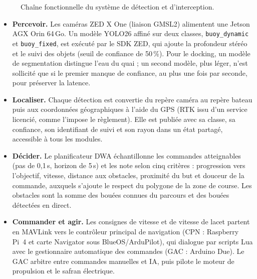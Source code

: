 \documentclass[11pt,letterpaper]{article}
\begin{document}
\begin{figure}[H]
\caption{Chaîne fonctionnelle du système de détection et d'interception.}
\label{fig:chaine}
\end{figure}

\begin{itemize}
    \item \textbf{Percevoir.} Les caméras ZED X One (liaison GMSL2) alimentent
    une Jetson AGX Orin 64\,Go. Un modèle YOLO26 affiné sur deux classes,
    \texttt{buoy\_dynamic} et \texttt{buoy\_fixed}, est exécuté par le SDK
    ZED, qui ajoute la profondeur stéréo et le suivi des objets (seuil de
    confiance de 50\,\%). Pour le docking, un modèle de segmentation distingue
    l'eau du quai ; un second modèle, plus léger, n'est sollicité que si le
    premier manque de confiance, au plus une fois par seconde, pour préserver
    la latence.
    \item \textbf{Localiser.} Chaque détection est convertie du repère caméra
    au repère bateau puis aux coordonnées géographiques à l'aide du GPS (RTK
    issu d'un service licencié, comme l'impose le règlement). Elle est publiée
    avec sa classe, sa confiance, son identifiant de suivi et son rayon dans un
    état partagé, accessible à tous les modules.
    \item \textbf{Décider.} Le planificateur DWA échantillonne les commandes
    atteignables (pas de 0,1\,s, horizon de 5\,s) et les note selon cinq
    critères : progression vers l'objectif, vitesse, distance aux obstacles,
    proximité du but et douceur de la commande, auxquels s'ajoute le respect
    du polygone de la zone de course. Les obstacles sont la somme des bouées
    connues du parcours et des bouées détectées en direct.
    \item \textbf{Commander et agir.} Les consignes de vitesse et de vitesse de
    lacet partent en MAVLink vers le contrôleur principal de navigation (CPN :
    Raspberry Pi~4 et carte Navigator sous BlueOS/ArduPilot), qui dialogue par
    scripts Lua avec le gestionnaire automatique des commandes (GAC : Arduino
    Due). Le GAC arbitre entre commandes manuelles et IA, puis pilote le
    moteur de propulsion et le safran électrique.
\end{itemize}
\end{document}
